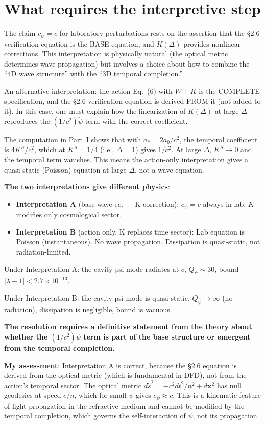 \documentclass[11pt]{article}
\newcommand{\ee}[1]{\times 10^{#1}}
\newcommand{\Qpsi}{Q_\psi}
\theoremstyle{definition}
\theoremstyle{remark}
\begin{document}
\section{What requires the interpretive step}

The claim $c_\psi = c$ for laboratory perturbations rests on the
assertion that the \S2.6 verification equation is the BASE equation,
and $K(\Delta)$ provides nonlinear corrections. This interpretation
is physically natural (the optical metric determines wave propagation)
but involves a choice about how to combine the ``4D wave structure''
with the ``3D temporal completion.''

An alternative interpretation: the action Eq.~(6) with $W + K$ is
the COMPLETE specification, and the \S2.6 verification equation is
derived FROM it (not added to it). In this case, one must explain
how the linearization of $K(\Delta)$ at large $\Delta$ reproduces
the $(1/c^2)\ddot\psi$ term with the correct coefficient.

The computation in Part~I shows that with $a_* = 2a_0/c^2$, the
temporal coefficient is $4K''/c^2$, which at $K'' = 1/4$ (i.e.,
$\Delta = 1$) gives $1/c^2$. At large $\Delta$, $K'' \to 0$ and
the temporal term vanishes. This means the action-only interpretation
gives a quasi-static (Poisson) equation at large $\Delta$, not a
wave equation.

\textbf{The two interpretations give different physics}:
\begin{itemize}
\item \textbf{Interpretation A} (base wave eq.\ + K correction):
  $c_\psi = c$ always in lab. $K$ modifies only cosmological sector.
\item \textbf{Interpretation B} (action only, K replaces time sector):
  Lab equation is Poisson (instantaneous). No wave propagation.
  Dissipation is quasi-static, not radiation-limited.
\end{itemize}

Under Interpretation A: the cavity psi-mode radiates at $c$,
$\Qpsi \sim 30$, bound $|\lambda-1| < 2.7\ee{-13}$.

Under Interpretation B: the cavity psi-mode is quasi-static,
$\Qpsi \to \infty$ (no radiation), dissipation is negligible,
bound is vacuous.

\textbf{The resolution requires a definitive statement from the
theory about whether the $(1/c^2)\ddot\psi$ term is part of the
base structure or emergent from the temporal completion.}

\textbf{My assessment}: Interpretation A is correct, because the
\S2.6 equation is derived from the optical metric (which is
fundamental in DFD), not from the action's temporal sector. The
optical metric $d\tilde{s}^2 = -c^2dt^2/n^2 + d\mathbf{x}^2$
has null geodesics at speed $c/n$, which for small $\psi$ gives
$c_\psi \approx c$. This is a kinematic feature of light propagation
in the refractive medium and cannot be modified by the temporal
completion, which governs the self-interaction of $\psi$, not its
propagation.
\end{document}
